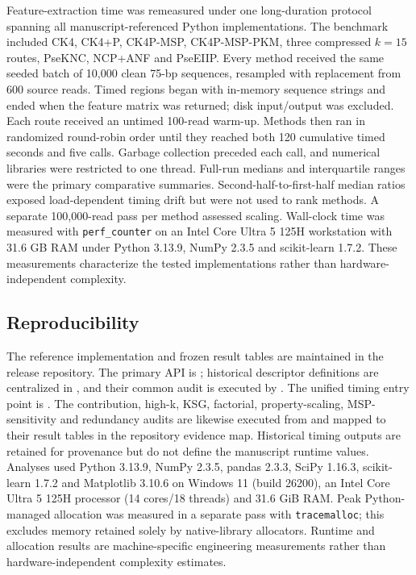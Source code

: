 Feature-extraction time was remeasured under one long-duration protocol spanning all manuscript-referenced Python implementations. The benchmark included CK4, CK4+P, CK4P-MSP, CK4P-MSP-PKM, three compressed $k=15$ routes, PseKNC, NCP+ANF and PseEIIP. Every method received the same seeded batch of 10,000 clean 75-bp sequences, resampled with replacement from 600 source reads. Timed regions began with in-memory sequence strings and ended when the feature matrix was returned; disk input/output was excluded. Each route received an untimed 100-read warm-up. Methods then ran in randomized round-robin order until they reached both 120 cumulative timed seconds and five calls. Garbage collection preceded each call, and numerical libraries were restricted to one thread. Full-run medians and interquartile ranges were the primary comparative summaries. Second-half-to-first-half median ratios exposed load-dependent timing drift but were not used to rank methods. A separate 100,000-read pass per method assessed scaling. Wall-clock time was measured with \texttt{perf\_counter} on an Intel Core Ultra 5 125H workstation with 31.6 GB RAM under Python 3.13.9, NumPy 2.3.5 and scikit-learn 1.7.2. These measurements characterize the tested implementations rather than hardware-independent complexity.

\subsection{Reproducibility}

The reference implementation and frozen result tables are maintained in the release repository. The primary API is ; historical descriptor definitions are centralized in , and their common audit is executed by . The unified timing entry point is . The contribution, high-k, KSG, factorial, property-scaling, MSP-sensitivity and redundancy audits are likewise executed from  and mapped to their result tables in the repository evidence map. Historical timing outputs are retained for provenance but do not define the manuscript runtime values. Analyses used Python 3.13.9, NumPy 2.3.5, pandas 2.3.3, SciPy 1.16.3, scikit-learn 1.7.2 and Matplotlib 3.10.6 on Windows 11 (build 26200), an Intel Core Ultra 5 125H processor (14 cores/18 threads) and 31.6 GiB RAM. Peak Python-managed allocation was measured in a separate pass with \texttt{tracemalloc}; this excludes memory retained solely by native-library allocators. Runtime and allocation results are machine-specific engineering measurements rather than hardware-independent complexity estimates.

